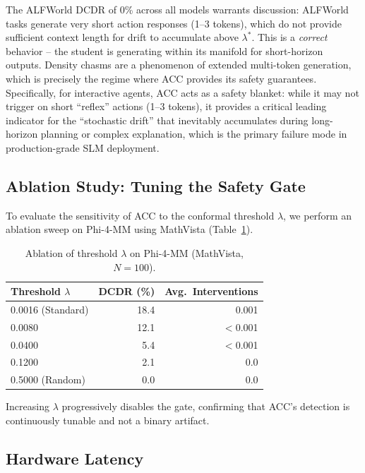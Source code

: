 \documentclass[runningheads]{article} %
\begin{document}
The ALFWorld DCDR of 0\% across all models warrants discussion:
ALFWorld tasks generate very short action responses (1--3 tokens),
which do not provide sufficient context length for drift to accumulate
above $\lambda^*$. This is a \emph{correct} behavior -- the student is
generating within its manifold for short-horizon outputs. Density chasms
are a phenomenon of extended multi-token generation, which is precisely
the regime where ACC provides its safety guarantees.
Specifically, for interactive agents, ACC acts as a safety blanket: while it may not trigger on short ``reflex'' actions (1--3 tokens), it provides a critical leading indicator for the ``stochastic drift'' that inevitably accumulates during long-horizon planning or complex explanation, which is the primary failure mode in production-grade SLM deployment.

\subsection{Ablation Study: Tuning the Safety Gate}
\label{subsec:ablation}

To evaluate the sensitivity of ACC to the conformal threshold $\lambda$,
we perform an ablation sweep on Phi-4-MM using MathVista (Table~\ref{tab:ablation}).

\begin{table}[htbp]
\centering
\caption{Ablation of threshold $\lambda$ on Phi-4-MM (MathVista, $N=100$).}
\label{tab:ablation}
\footnotesize
\begin{tabular}{@{}lrr@{}}
\toprule
\textbf{Threshold} $\lambda$ & \textbf{DCDR (\%)} & \textbf{Avg.\ Interventions} \\
\midrule
0.0016 (Standard) & 18.4 & 0.001 \\
0.0080            & 12.1 & $<$0.001 \\
0.0400            & 5.4  & $<$0.001 \\
0.1200            & 2.1  & 0.0 \\
0.5000 (Random)   & 0.0  & 0.0 \\
\bottomrule
\end{tabular}
\end{table}

Increasing $\lambda$ progressively disables the gate, confirming that
ACC's detection is continuously tunable and not a binary artifact.

\subsection{Hardware Latency}
\end{document}

